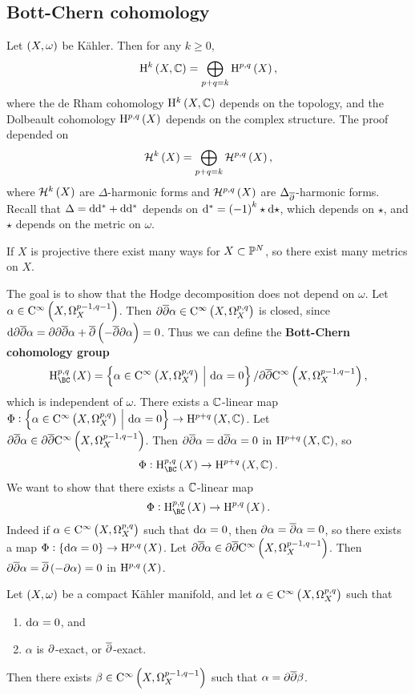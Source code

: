 \subsection{Bott-Chern cohomology}


Let $ \br{X, \omega} $ be K\"ahler. Then for any $ k \ge 0 $,
$$ \H^k\br{X, \CC} = \bigoplus_{p + q = k} \H^{p, q}\br{X}, $$
where the de Rham cohomology $ \H^k\br{X, \CC} $ depends on the topology, and the Dolbeault cohomology $ \H^{p, q}\br{X} $ depends on the complex structure. The proof depended on
$$ \HHH^k\br{X} = \bigoplus_{p + q = k} \HHH^{p, q}\br{X}, $$
where $ \HHH^k\br{X} $ are $ \Delta $-harmonic forms and $ \HHH^{p, q}\br{X} $ are $ \Delta_{\overline{\partial}} $-harmonic forms. Recall that $ \Delta = \mathrm{d}\mathrm{d}^* + \mathrm{d}\mathrm{d}^* $ depends on $ \d^* = \br{-1}^k\star\d\star $, which depends on $ \star $, and $ \star $ depends on the metric on $ \omega $.

\begin{example*}
If $ X $ is projective there exist many ways for $ X \subset \mathbb{P}^N $, so there exist many metrics on $ X $.
\end{example*}

The goal is to show that the Hodge decomposition does not depend on $ \omega $. Let $ \alpha \in \CO{X}{p - 1, q - 1} $. Then $ \da\dab\alpha \in \CO{X}{p, q} $ is closed, since $ \d\da\dab\alpha = \da\da\dab\alpha + \dab\br{-\dab\da\alpha} = 0 $. Thus we can define the \textbf{Bott-Chern cohomology group}
$$ \H_{\BC}^{p, q}\br{X} = \cbr{\alpha \in \CO{X}{p, q} \st \d\alpha = 0} / \da\dab\CO{X}{p - 1, q - 1}, $$
which is independent of $ \omega $. There exists a $ \mathbb{C} $-linear map $ \Phi : \cbr{\alpha \in \CO{X}{p, q} \st \d\alpha = 0} \to \H^{p + q}\br{X, \CC} $. Let $ \da\dab\alpha \in \da\dab\CO{X}{p - 1, q - 1} $. Then $ \partial\overline{\partial}\alpha = \mathrm{d}\overline{\partial}\alpha = 0 $ in $ \H^{p + q}\br{X, \CC} $, so
$$ \Phi : \H_{\BC}^{p, q}\br{X} \to \H^{p + q}\br{X, \CC}. $$
We want to show that there exists a $ \mathbb{C} $-linear map
$$ \Phi : \H_{\BC}^{p, q}\br{X} \to \H^{p, q}\br{X}. $$
Indeed if $ \alpha \in \CO{X}{p, q} $ such that $ \mathrm{d}\alpha = 0 $, then $ \partial\alpha = \overline{\partial}\alpha = 0 $, so there exists a map $ \Phi : \cbr{\d\alpha = 0} \to \H^{p, q}\br{X} $. Let $ \da\dab\alpha \in \da\dab\CO{X}{p - 1, q - 1} $. Then $ \da\dab\alpha = \dab\br{-\da\alpha} = 0 $ in $ \H^{p, q}\br{X} $.

\pagebreak

\begin{lemma}
Let $ \br{X, \omega} $ be a compact K\"ahler manifold, and let $ \alpha \in \CO{X}{p, q} $ such that
\begin{enumerate}
\item $ \mathrm{d}\alpha = 0 $, and
\item $ \alpha $ is $ \partial $-exact, or $ \overline{\partial} $-exact.
\end{enumerate}
Then there exists $ \beta \in \CO{X}{p - 1, q - 1} $ such that $ \alpha = \partial\overline{\partial}\beta $.
\end{lemma}

